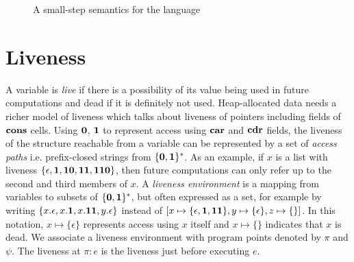 \documentclass[9pt]{sigplanconf}
\begin{document}
\begin{figure*}[t!]
\begin{center}
\caption{A small-step semantics for the language}\label{fig:lang-semantics}
\end{center}
\end{figure*}


\renewcommand{\pp}[2]{\ensuremath{#1\!\!:\!#2}} %



\section{Liveness}\label{sec:liveness}

A variable is {\em live} if  there is a possibility of its value being
used in  future computations  and dead if  it is definitely  not used.
Heap-allocated data needs a richer model of liveness which talks about
liveness  of  pointers  including  fields  of  $\mbox{$\mathbf{cons}$}$  cells.   Using
$\mathbf{0}$, $\mathbf{1}$  to represent access using $\mbox{$\mathbf{car}$}$  and $\mbox{$\mathbf{cdr}$}$ fields,
the  liveness  of the  structure  reachable  from  a variable  can  be
represented by a set of {\em access paths} i.e.  prefix-closed strings
from $\{\mathbf{0},\mathbf{1}\}^\ast$.   As an  example, if $x$  is a  list with
liveness      $\{\epsilon,     \mathbf{1},      \mathbf{1}\mathbf{0},     \mathbf{1}\mathbf{1},
\mathbf{1}\mathbf{1}\mathbf{0}\}$, then future computations  can only refer up to the
second and  third members of $x$.   A {\em liveness  environment} is a
mapping from variables to subsets of $\{\mathbf{0},\mathbf{1}\}^\ast$, but often
expressed  as a set,  for example  by writing  $\{x.\epsilon, x.\mathbf{1},
x.\mathbf{1}\mathbf{1},        y.\epsilon\}$        instead        of        $[x
  \mapsto\{\epsilon,\mathbf{1},\mathbf{1}\mathbf{1}\},           y\mapsto\{\epsilon\},
  z\mapsto\{\}]$.    In  this   notation,  $x   \mapsto  \{\epsilon\}$
represents access using $x$ itself and $x \mapsto \{\}$ indicates that
$x$ is dead.  We associate  a liveness environment with program points
denoted by $\pi$ and $\psi$.  The liveness at $\pi:e$  is the liveness just before executing
$e$.
\end{document}
